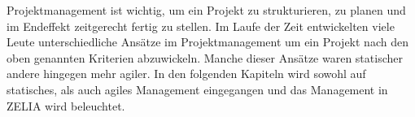 
Projektmanagement ist wichtig, um ein Projekt zu strukturieren, zu planen und im Endeffekt zeitgerecht fertig zu stellen. Im Laufe der Zeit entwickelten viele Leute unterschiedliche Ansätze im Projektmanagement um ein Projekt nach den oben genannten Kriterien abzuwickeln. Manche dieser Ansätze waren statischer andere hingegen mehr agiler. In den folgenden Kapiteln wird sowohl auf statisches, als auch agiles Management eingegangen und das Management in ZELIA wird beleuchtet.
